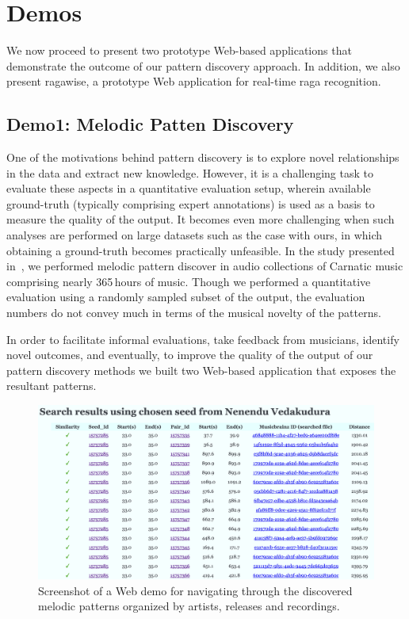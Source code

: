 \section{Demos}
\label{sec:demos}

We now proceed to present two prototype Web-based applications that demonstrate the outcome of our pattern discovery approach. In addition, we also present \gls{ragawise}, a prototype Web application for real-time \gls{raga} recognition. 

\subsection*{Demo1: Melodic Patten Discovery}

One of the motivations behind pattern discovery is to explore novel relationships in the data and extract new knowledge. However, it is a challenging task to evaluate these aspects  in a quantitative evaluation setup, wherein available ground-truth (typically comprising expert annotations) is used as a basis to measure the quality of the output. It becomes even more challenging when such analyses are performed on large datasets such as the case with ours, in which obtaining a ground-truth becomes practically unfeasible.  In the study presented in~\secref{}, we performed melodic pattern discover in audio collections of Carnatic music comprising nearly 365\,hours of music. Though we performed a quantitative evaluation using a randomly sampled subset of the output, the evaluation numbers do not convey much in terms of the musical novelty of the patterns. 

In order to facilitate informal evaluations, take feedback from musicians, identify novel outcomes, and eventually, to improve the quality of the output of our pattern discovery methods we built two Web-based application that exposes the resultant patterns. 

\begin{figure}
	\begin{center}
		\includegraphics[width=\figSizeHundred]{ch08_applications/figures/patternBrowsing1.png}
	\end{center}
	\caption{Screenshot of a Web demo for navigating through the discovered melodic patterns organized by artists, releases and recordings.}
	\label{fig:browser_patterns}
\end{figure}

